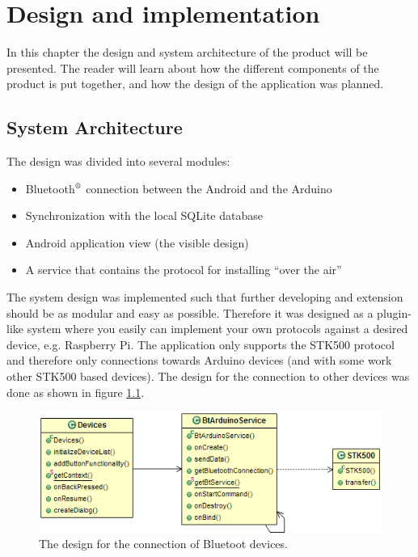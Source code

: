 \chapter{Design and implementation}
In this chapter the design and system architecture of the product will be presented. The reader will learn about how the different components of the product is put together, and how the design of the application was planned.

\section{System Architecture}
	The design was divided into several modules:
	\begin{itemize}
		\item{Bluetooth$\textsuperscript{\textregistered}$ connection between the Android and the Arduino}
		\item{Synchronization with the local SQLite database}
		\item{Android application view (the visible design)}
		\item{A service that contains the protocol for installing ``over the air''}
	\end{itemize}
	\vspace{0.2in}
	
	The system design was implemented such that further developing and extension should be as modular and easy as possible.
	Therefore it was designed as a plugin-like system where you easily can implement your own protocols against a desired device, e.g. Raspberry Pi. The application only supports the STK500 protocol and therefore only connections towards Arduino devices (and with some work other STK500 based devices).
	The design for the connection to other devices was done as shown in figure \ref{BTConnection}.\\

	\begin{figure}[H]
	\centering
	\includegraphics[width=130mm]{images/BTConnection.png}
	\caption{The design for the connection of Bluetoot devices.}
	\label{BTConnection}
	\end{figure}

